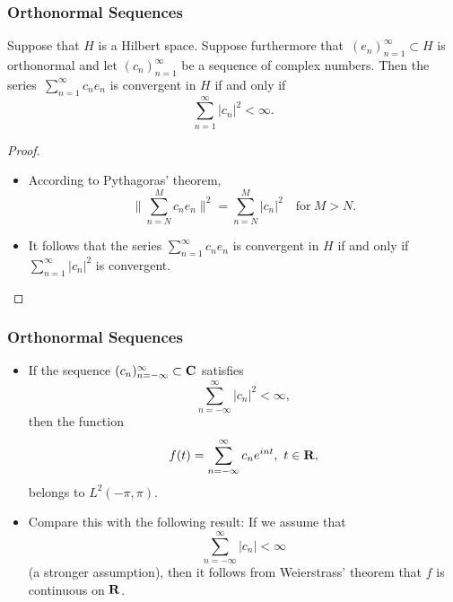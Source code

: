 \documentclass[handout]{beamer}
\theoremstyle{remark}
\newcommand{\R}{{\bf R}}
\newcommand{\C}{{\bf C}}
\begin{document}
\begin{frame}[shrink=15]\frametitle{Orthonormal Sequences}

\begin{lemma}
Suppose that $H$ is a Hilbert space. Suppose furthermore that\/~$(e_n)^\infty_{n=1}\subset H$ is
orthonormal and let\/ $(c_n)^\infty_{n=1}$ be a sequence of complex numbers.
Then the series\/~$\sum^\infty_{n=1}c_ne_n$ is convergent in $H$ if and only if\/
$$\sum^\infty_{n=1}|c_n|^2<\infty.$$
\end{lemma}

\begin{proof}
\begin{itemize}
\item According to Pythagoras' theorem,
$$\biggl\|\sum^M_{n=N}c_ne_n\biggr\|^2=\sum^M_{n=N}|c_n|^2\quad\mbox{for}\ M>N.$$
\item It follows that the series $\sum^\infty_{n=1}c_ne_n$ is convergent in $H$ if and only
if\/~$\sum^\infty_{n=1}|c_n|^2$ is convergent.\qedhere
\end{itemize}
\end{proof}

\end{frame}

\begin{frame}[shrink=20]\frametitle{Orthonormal Sequences}

\begin{example}
\begin{itemize}
\item If the sequence $(c_n)^\infty_{n=-\infty}\subset\C$ satisfies
$$\sum^\infty_{n=-\infty}|c_n|^2<\infty,$$
then the function
$$f(t)=\sum^\infty_{n=-\infty}c_ne^{int},\ t\in\R,$$
belongs to $L^2(-\pi,\pi)$.
\item Compare this with the following result: If we assume that
$$\sum^\infty_{n=-\infty}|c_n|<\infty$$
(a stronger assumption), then it follows from Weierstrass' theorem that $f$ is continuous on $\R$.
\end{itemize}
\end{example}

\end{frame}
\end{document}
